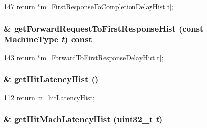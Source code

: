 \begin{DoxyCode}
147     { return *m_FirstResponseToCompletionDelayHist[t]; }
\end{DoxyCode}
\hypertarget{classSequencer_a39c21f2486b1d7dc3ca2a11ddf5378ce}{
\subsubsection[{getForwardRequestToFirstResponseHist}]{\& getForwardRequestToFirstResponseHist (const MachineType {\em t}) const}}
\label{classSequencer_a39c21f2486b1d7dc3ca2a11ddf5378ce}



\begin{DoxyCode}
143     { return *m_ForwardToFirstResponseDelayHist[t]; }
\end{DoxyCode}
\hypertarget{classSequencer_a60d594e19c05f710687dabeccab69cb4}{
\subsubsection[{getHitLatencyHist}]{\& getHitLatencyHist ()}}
\label{classSequencer_a60d594e19c05f710687dabeccab69cb4}



\begin{DoxyCode}
112 { return m_hitLatencyHist; }
\end{DoxyCode}
\hypertarget{classSequencer_a1923ce01b6ae7bce28ca59c6df159058}{
\subsubsection[{getHitMachLatencyHist}]{\& getHitMachLatencyHist ({\bf uint32\_\-t} {\em t})}}
\label{classSequencer_a1923ce01b6ae7bce28ca59c6df159058}



